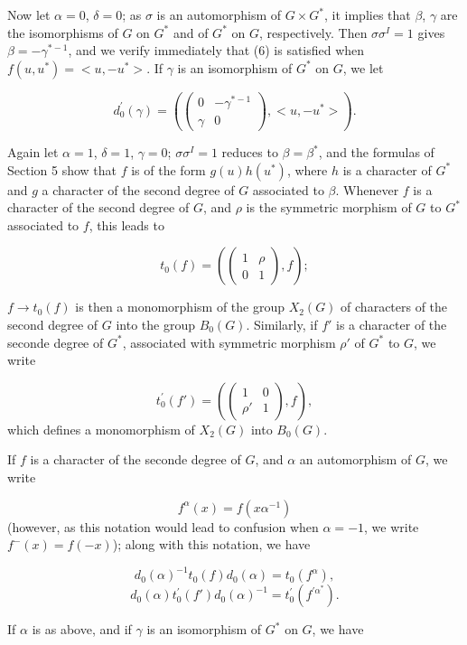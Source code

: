 \documentclass[12pt]{amsart}
\begin{document}
Now let $\alpha=0$, $\delta=0$; as $\sigma$ is an automorphism
of $G\times G^{*}$, it implies that $\beta$, $\gamma$ are the isomorphisms
of $G$ on $G^{*}$ and of $G^{*}$ on $G$, respectively. Then $\sigma\sigma^{I}=1$
gives $\beta=-\gamma^{*-1}$, and we verify immediately that (6) is
satisfied when $f(u,u^{*})=<u,-u^{*}>$. If $\gamma$ is an isomorphism
of $G^{*}$ on $G$, we let

\[
d_{0}^{'}(\gamma)=\left(\left(\begin{array}{cc}
0 & -\gamma^{*-1}\\
\gamma & 0\end{array}\right),<u,-u^{*}>\right).\]


Again let $\alpha=1$, $\delta=1$, $\gamma=0$; $\sigma\sigma^{I}=1$
reduces to $\beta=\beta^{*}$, and the formulas of Section 5 show
that $f$ is of the form $g(u)h(u^{*})$, where $h$ is a character
of $G^{*}$ and $g$ a character of the second degree of $G$ associated
to $\beta$. Whenever $f$ is a character of the second degree of
$G$, and $\rho$ is the symmetric morphism of $G$ to $G^{*}$associated
to $f$, this leads to

\[
t_{0}(f)=\left(\left(\begin{array}{cc}
1 & \rho\\
0 & 1\end{array}\right),f\right);\]


$f\rightarrow t_{0}(f)$ is then a monomorphism of the group $X_{2}(G)$
of characters of the second degree of $G$ into the group $B_{0}(G)$.
Similarly, if $f'$ is a character of the seconde degree of $G^{*}$,
associated with symmetric morphism $\rho'$ of $G^{*}$ to $G$, we
write

\[
t_{0}^{'}(f')=\left(\left(\begin{array}{cc}
1 & 0\\
\rho' & 1\end{array}\right),f\right),\]
 which defines a monomorphism of $X_{2}(G)$ into $B_{0}(G)$.

If $f$ is a character of the seconde degree of $G$, and $\alpha$
an automorphism of $G$, we write

\[
f^{\alpha}(x)=f(x\alpha^{-1})\]
(however, as this notation would lead to confusion when $\alpha=-1$,
we write $f^{-}(x)=f(-x)$); along with this notation, we have

\[
d_{0}(\alpha)^{-1}t_{0}(f)d_{0}(\alpha)=t_{0}(f^{\alpha}),\]
\[
d_{0}(\alpha)t_{0}^{'}(f')d_{0}(\alpha)^{-1}=t_{0}^{'}(f^{'\alpha^{*}}).\]


If $\alpha$ is as above, and if $\gamma$ is an isomorphism of $G^{*}$
on $G$, we have
\end{document}
